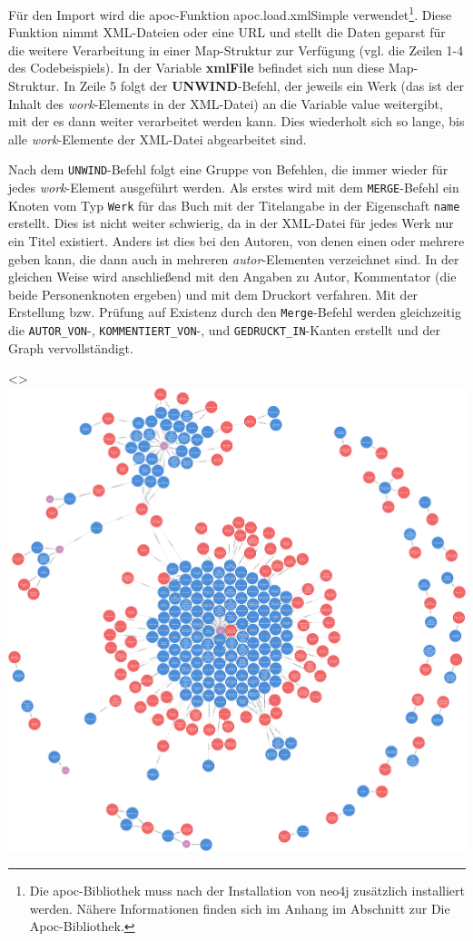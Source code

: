 \documentclass[ngerman,]{scrreprt}
\begin{document}
Für den Import wird die apoc-Funktion apoc.load.xmlSimple verwendet\footnote{Die apoc-Bibliothek muss nach der Installation von neo4j zusätzlich installiert werden. Nähere Informationen finden sich im Anhang im Abschnitt zur Die Apoc-Bibliothek.}. Diese Funktion nimmt XML-Dateien oder eine URL und stellt die Daten geparst für die weitere Verarbeitung in einer Map-Struktur zur Verfügung (vgl. die Zeilen 1-4 des Codebeispiels). In der Variable \textbf{xmlFile} befindet sich nun diese Map-Struktur. In Zeile 5 folgt der \textbf{UNWIND}-Befehl, der jeweils ein Werk (das ist der Inhalt des \emph{work}-Elements in der XML-Datei) an die Variable value weitergibt, mit der es dann weiter verarbeitet werden kann. Dies wiederholt sich so lange, bis alle \emph{work}-Elemente der XML-Datei abgearbeitet sind.

Nach dem \texttt{UNWIND}-Befehl folgt eine Gruppe von Befehlen, die immer wieder für jedes \emph{work}-Element ausgeführt werden. Als erstes wird mit dem \texttt{MERGE}-Befehl ein Knoten vom Typ \texttt{Werk} für das Buch mit der Titelangabe in der Eigenschaft \texttt{name} erstellt. Dies ist nicht weiter schwierig, da in der XML-Datei für jedes Werk nur ein Titel existiert. Anders ist dies bei den Autoren, von denen einen oder mehrere geben kann, die dann auch in mehreren \emph{autor}-Elementen verzeichnet sind. In der gleichen Weise wird anschließend mit den Angaben zu Autor, Kommentator (die beide Personenknoten ergeben) und mit dem Druckort verfahren. Mit der Erstellung bzw. Prüfung auf Existenz durch den \texttt{Merge}-Befehl werden gleichzeitig die \texttt{AUTOR\_VON}-, \texttt{KOMMENTIERT\_VON}-, und \texttt{GEDRUCKT\_IN}-Kanten erstellt und der Graph vervollständigt.

\textless{}\textgreater{}\includegraphics{Bilder/Kollatz-Druckernetzwerk.png}
\end{document}
